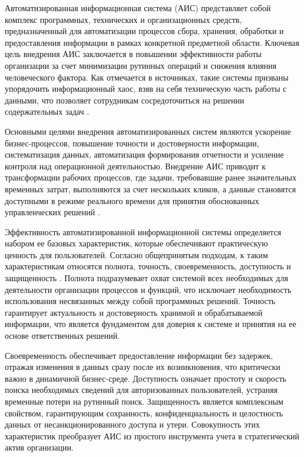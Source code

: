 \documentclass{SibFU-docs}
\begin{document}
Автоматизированная информационная система (АИС) представляет собой комплекс программных, технических и организационных средств, предназначенный для автоматизации процессов сбора, хранения, обработки и предоставления информации в рамках конкретной предметной области. Ключевая цель внедрения АИС заключается в повышении эффективности работы организации за счет минимизации рутинных операций и снижения влияния человеческого фактора. Как отмечается в источниках, такие системы призваны упорядочить информационный хаос, взяв на себя техническую часть работы с данными, что позволяет сотрудникам сосредоточиться на решении содержательных задач \cite{ais_basics}.

Основными целями внедрения автоматизированных систем являются ускорение бизнес-процессов, повышение точности и достоверности информации, систематизация данных, автоматизация формирования отчетности и усиление контроля над операционной деятельностью. Внедрение АИС приводит к трансформации рабочих процессов, где задачи, требовавшие ранее значительных временных затрат, выполняются за счет нескольких кликов, а данные становятся доступными в режиме реального времени для принятия обоснованных управленческих решений \cite{ais_efficiency}.


Эффективность автоматизированной информационной системы определяется набором ее базовых характеристик, которые обеспечивают практическую ценность для пользователей. Согласно общепринятым подходам, к таким характеристикам относятся полнота, точность, своевременность, доступность и защищенность \cite{ais_components}. Полнота подразумевает охват системой всех необходимых для деятельности организации процессов и функций, что исключает необходимость использования несвязанных между собой программных решений. Точность гарантирует актуальность и достоверность хранимой и обрабатываемой информации, что является фундаментом для доверия к системе и принятия на ее основе ответственных решений.

Своевременность обеспечивает предоставление информации без задержек, отражая изменения в данных сразу после их возникновения, что критически важно в динамичной бизнес-среде. Доступность означает простоту и скорость поиска необходимых сведений для авторизованных пользователей, устраняя временные потери на рутинный поиск. Защищенность является комплексным свойством, гарантирующим сохранность, конфиденциальность и целостность данных от несанкционированного доступа и утери. Совокупность этих характеристик преобразует АИС из простого инструмента учета в стратегический актив организации.
\end{document}
